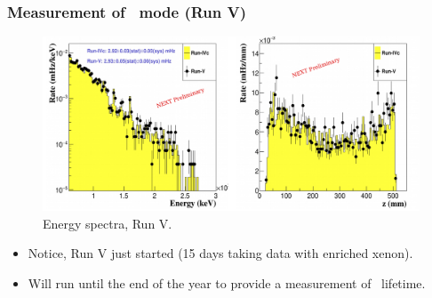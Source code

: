 \begin{frame}
\frametitle{Measurement of \bbtnu\ mode (Run V)} 
\begin{figure}
  \begin{center}
    \includegraphics[scale=0.4]{moriond/run5_spectra.png}
    \caption{Energy spectra, Run V.}
    \label{fig:rate}
  \end{center}
\end{figure}
\begin{itemize}
\item Notice, Run V just started (15 days taking data with enriched xenon). 
\item Will run until the end of the year to provide a measurement of \bbtnu\ lifetime.  
\end{itemize}
\end{frame}

